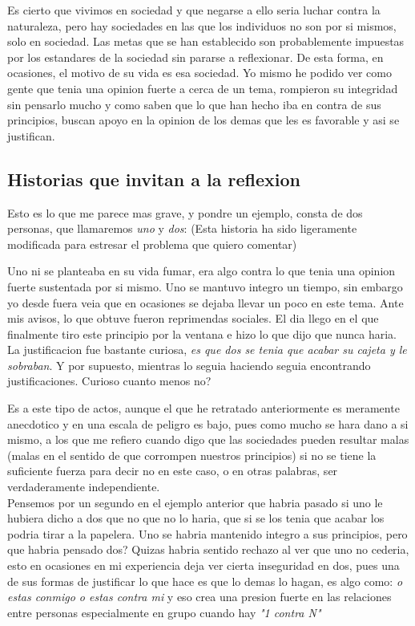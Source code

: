 Es cierto que vivimos en sociedad y que negarse a ello seria luchar contra la naturaleza, pero hay sociedades en las que los individuos no son por si mismos, solo en sociedad. Las metas que se han establecido son probablemente impuestas por los estandares de la sociedad sin pararse a reflexionar. De esta forma, en ocasiones, el motivo de su vida es esa sociedad.
Yo mismo he podido ver como gente que tenia una opinion fuerte a cerca de un tema, rompieron su integridad sin pensarlo mucho y como saben que lo que han hecho iba en contra de sus principios, buscan apoyo en la opinion de los demas que les es favorable y asi se justifican. 
\subsection{Historias que invitan a la reflexion}
Esto es lo que me parece mas grave, y pondre un ejemplo, consta de dos personas, que llamaremos \textit{uno} y \textit{dos}:
(Esta historia ha sido ligeramente modificada para estresar el problema que quiero comentar)

Uno ni se planteaba en su vida fumar, era algo contra lo que tenia una opinion fuerte sustentada por si mismo. Uno se mantuvo integro un tiempo, sin embargo yo desde fuera veia que en ocasiones se dejaba llevar un poco en este tema. Ante mis avisos, lo que obtuve fueron reprimendas sociales. El dia llego en el que finalmente tiro este principio por la ventana e hizo lo que dijo que nunca haria. La justificacion fue bastante curiosa, \textit{es que dos se tenia que acabar su cajeta y le sobraban}. Y por supuesto, mientras lo seguia haciendo seguia encontrando justificaciones. Curioso cuanto menos no? 

Es a este tipo de actos, aunque el que he retratado anteriormente es meramente anecdotico y en una escala de peligro es bajo, pues como mucho se hara dano a si mismo, a los que me refiero cuando digo que las sociedades pueden resultar malas (malas en el sentido de que corrompen nuestros principios) si no se tiene la suficiente fuerza para decir no en este caso, o en otras palabras, ser verdaderamente independiente. \\

Pensemos por un segundo en el ejemplo anterior que habria pasado si uno le hubiera dicho a dos que no que no lo haria, que si se los tenia que acabar los podria tirar a la papelera. Uno se habria mantenido integro a sus principios, pero que habria pensado dos? Quizas habria sentido rechazo al ver que uno no cederia, esto en ocasiones en mi experiencia deja ver cierta inseguridad en dos, pues una de sus formas de justificar lo que hace es que lo demas lo hagan, es algo como: \textit{o estas conmigo o estas contra mi} y eso crea una presion fuerte en las relaciones entre personas especialmente en grupo cuando hay \textit{"1 contra N"} \\

